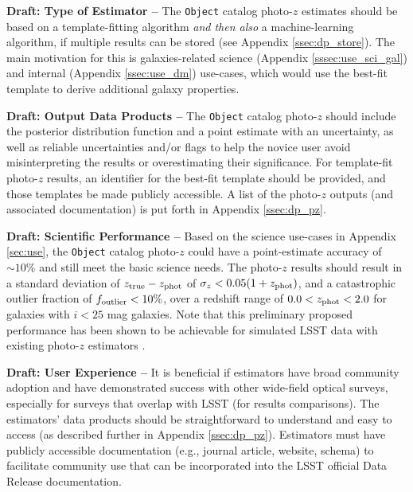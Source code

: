 \documentclass[DM,lsstdraft,toc]{lsstdoc}
\begin{document}
{\bf Draft: Type of Estimator --} 
The {\tt Object} catalog photo-$z$ estimates should be based on a template-fitting algorithm {\it and then also} a machine-learning algorithm, if multiple results can be stored (see Appendix \ref{ssec:dp_store}).
The main motivation for this is galaxies-related science (Appendix \ref{sssec:use_sci_gal}) and internal (Appendix \ref{ssec:use_dm}) use-cases, which would use the best-fit template to derive additional galaxy properties.

{\bf Draft: Output Data Products --} 
The {\tt Object} catalog photo-$z$ should include the posterior distribution function and a point estimate with an uncertainty, as well as reliable uncertainties and/or flags to help the novice user avoid misinterpreting the results or overestimating their significance.
For template-fit photo-$z$ results, an identifier for the best-fit template should be provided, and those templates be made publicly accessible.
A list of the photo-$z$ outputs (and associated documentation) is put forth in Appendix \ref{ssec:dp_pz}.

{\bf Draft: Scientific Performance --} 
Based on the science use-cases in Appendix \ref{sec:use}, the {\tt Object} catalog photo-$z$ could have a point-estimate accuracy of $\sim10\%$ and still meet the basic science needs.
The photo-$z$ results should result in a standard deviation of $z_{\rm true}-z_{\rm phot}$ of $\sigma_z < 0.05(1+z_{\rm phot})$, and a catastrophic outlier fraction of $f_{\rm outlier} < 10\%$, over a redshift range of $0.0 < z_{\rm phot} < 2.0$ for galaxies with $i<25$ mag galaxies.
Note that this preliminary proposed performance has been shown to be achievable for simulated LSST data with existing photo-$z$ estimators \citep[e.g.,][]{2018AJ....155....1G,2020arXiv200103621S}.

{\bf Draft: User Experience --}
It is beneficial if estimators have broad community adoption and have demonstrated success with other wide-field optical surveys, especially for surveys that overlap with LSST (for results comparisons).
The estimators' data products should be straightforward to understand and easy to access (as described further in Appendix \ref{ssec:dp_pz}).
Estimators must have publicly accessible documentation (e.g., journal article, website, schema) to facilitate community use that can be incorporated into the LSST official Data Release documentation. 
\end{document}
